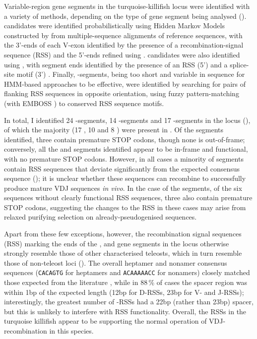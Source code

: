 Variable-region gene segments in the turquoise-killifish \igh{} locus were identified with a variety of methods, depending on the type of gene segment being analysed (). \vh candidates were identified probabilistically using Hidden Markov Models constructed by  \parencite{wheeler2013nhmmer} from  \parencite{loytynoja2014prank} multiple-sequence alignments of reference sequences, with the 3'-ends of each V-exon identified by the presence of a recombination-signal sequence (RSS) \parencite{schroeder2010immunoglobulins} and the 5'-ends refined using  \parencite{ehrenmann2011domaingapalign}. \jh candidates were also identified using , with segment ends identified by the presence of an RSS (5') and a  splice-site motif (3') \parencite{magadan2011medaka}. Finally, \dh-segments, being too short and variable in sequence for HMM-based approaches to be effective, were identified by searching for pairs of flanking RSS sequences in opposite orientation, using fuzzy pattern-matching (with EMBOSS  \parencite{rice2000emboss}) to conserved RSS sequence motifs.
	 
In total, I identified 24 \vh-segments, 14 \dh-segments and 17 \jh-segments in the \Nfu locus (), of which the majority (17 \vh, 10 \dh and 8 \jh) were present in . Of the \vh segments identified, three contain premature STOP codons, though none is out-of-frame; conversely, all the \dh and \jh segments identified appear to be in-frame and functional, with no premature STOP codons. However, in all cases a minority of segments contain RSS sequences that deviate significantly from the expected consensus sequence (); it is unclear whether these sequences can recombine to successfully produce mature VDJ sequences \textit{in vivo}. In the case of the \vh segments, of the six sequences without clearly functional RSS sequences, three also contain premature STOP codons, suggesting the changes to the RSS in these cases may arise from relaxed purifying selection on already-pseudogenised sequences.

Apart from these few exceptions, however, the recombination signal sequences (RSS) marking the ends of the \vh, \dh and \jh gene segments in the \Nfu locus otherwise strongly resemble those of other characterised teleosts, which in turn resemble those of non-teleost loci (). The overall heptamer and nonamer consensus sequences (\texttt{CACAGTG} for heptamers and \texttt{ACAAAAACC} for nonamers) closely matched those expected from the literature \parencite{schroeder2010immunoglobulins}, while in 88\,\% of cases the spacer region was within 1bp of the expected length (12bp for D-RSSs, 23bp for V- and J-RSSs); interestingly, the greatest number of \vh-RSSs had a 22bp (rather than 23bp) spacer, but this is unlikely to interfere with RSS functionality. Overall, the RSSs in the turquoise killifish appear to be supporting the normal operation of VDJ-recombination in this species.

